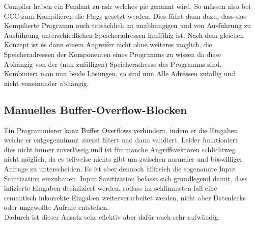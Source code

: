 Compiler haben ein Pendant zu \gls*{aslr} welches \gls*{pie}
genannt wird. So müssen also bei GCC zum Kompilieren die Flags 
gesetzt werden. Dies führt dann dazu, dass das Kompilierte Programm auch tatsächlich an
unabhängigen und von Ausführung zu Ausführung unterschiedlichen Speicheradressen lauffähig
ist.
Nach dem gleichen Konzept ist es dann einem Angreifer nicht ohne weiteres möglich, die
Speicheradressen der Komponenten eines Programms zu wissen da diese Abhängig
von der (nun zufälligen) Speicheradresse des Programms sind. Kombiniert man nun beide Lösungen,
so sind nun Alle Adressen zufällig und nicht voneinander abhängig.

\subsection{Manuelles Buffer-Overflow-Blocken}
Ein Programmierer kann Buffer Overflows verhindern, indem er die Eingaben
welche er entgegennimmt zuerst filtert und dann validiert. Leider funktioniert
dies nicht immer zuverlässig und ist für manche Angriffsvektoren schlichtweg nicht
möglich, da es teilweise nichts gibt um zwischen normaler und böswilliger Anfrage zu
unterscheiden. Es ist aber dennoch hilfreich die sogenannte Input Sanitization einzubauen.
Input Sanitization befasst sich grundlegend damit, dass infizierte Eingaben desinfiziert
werden, sodass im schlimmsten fall eine semantisch inkorrekte Eingaben weiterverarbeitet
werden, nicht aber Datenlecks oder ungewollte Aufrufe entstehen. \cite{sanitize} \\
Dadurch ist dieser Ansatz sehr effektiv aber dafür auch sehr aufwändig.




